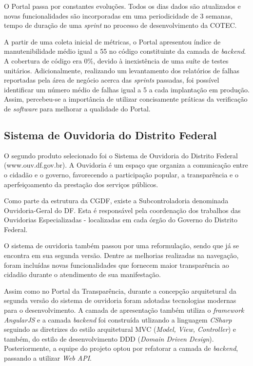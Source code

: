 O Portal passa por constantes evoluções. Todos os dias dados são atualizados e novas funcionalidades são incorporadas em uma periodicidade de 3 semanas, tempo de duração de uma \textit{sprint} no processo de desenvolvimento da COTEC. 

A partir de uma coleta inicial de métricas, o Portal apresentou índice de manutenibilidade médio igual a 55 no código constituinte da camada de \textit{backend}. A cobertura de código era 0\%, devido à inexistência de uma suíte de testes unitários. Adicionalmente, realizando um levantamento dos relatórios de falhas reportadas pela área de negócio acerca das \textit{sprints} passadas, foi possível identificar um número médio de falhas igual a 5 a cada implantação em produção. Assim, percebeu-se a importância de utilizar concisamente práticas da verificação de \textit{software} para melhorar a qualidade do Portal.

\subsection{Sistema de Ouvidoria do Distrito Federal}

O segundo produto selecionado foi o Sistema de Ouvidoria do Distrito Federal (www.ouv.df.gov.br). A Ouvidoria é um espaço que organiza a comunicação entre o cidadão e o governo, favorecendo a participação popular, a transparência e o aperfeiçoamento da prestação dos serviços públicos.

Como parte da estrutura da CGDF, existe a Subcontroladoria denominada Ouvidoria-Geral do DF. Esta é responsável pela coordenação dos trabalhos das Ouvidorias Especializadas - localizadas em cada órgão do Governo do Distrito Federal.

O sistema de ouvidoria também passou por uma reformulação, sendo que já se encontra em sua segunda versão. Dentre as melhorias realizadas na navegação, foram incluídas novas funcionalidades que fornecem maior transparência ao cidadão durante o atendimento de sua manifestação.

Assim como no Portal da Transparência, durante a concepção arquitetural da segunda versão do sistema de ouvidoria foram adotadas tecnologias modernas para o desenvolvimento. A camada de apresentação também utiliza o \textit{framework AngularJS} e a camada \textit{backend} foi construída utlizando a linguagem \textit{CSharp} seguindo as diretrizes do estilo arquitetural MVC (\textit{Model, View, Controller}) e também, do estilo de desenvolvimento DDD (\textit{Domain Driven Design}). Posteriormente, a equipe do projeto optou por refatorar a camada de \textit{backend}, passando a utilizar \textit{Web API}.

